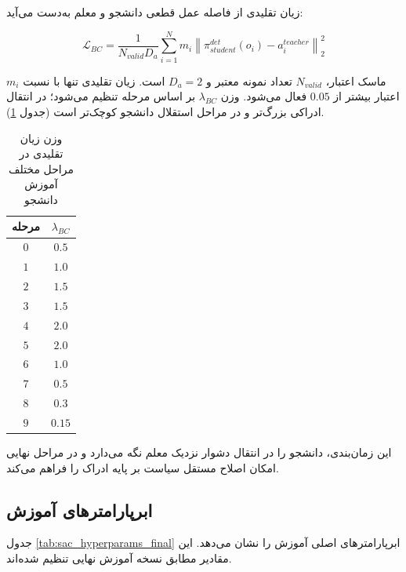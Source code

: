 زیان تقلیدی از فاصله عمل قطعی دانشجو و معلم به‌دست می‌آید:

\begin{equation}
	\mathcal{L}_{BC}=
	\frac{1}{N_{valid}D_a}
	\sum_{i=1}^{N}
	m_i
	\left\|
	\pi^{det}_{student}(o_i)-a^{teacher}_i
	\right\|_2^2
	\label{eq:bc_loss_final}
\end{equation}

\(m_i\) ماسک اعتبار، \(N_{valid}\) تعداد نمونه معتبر و \(D_a=2\) است. زیان تقلیدی تنها با نسبت اعتبار بیشتر از \(0.05\) فعال می‌شود. وزن \(\lambda_{BC}\) بر اساس مرحله تنظیم می‌شود؛ در انتقال ادراکی بزرگ‌تر و در مراحل استقلال دانشجو کوچک‌تر است (جدول \ref{tab:bc_weight_by_stage_final}).

\begin{table}[htbp]
	\centering
	\caption{وزن زیان تقلیدی در مراحل مختلف آموزش دانشجو}
	\label{tab:bc_weight_by_stage_final}
	\begin{tabular}{|c|c|}
		\hline
		\textbf{مرحله} & \(\lambda_{BC}\) \\
		\hline
		$0$ & $0.5$ \\
		\hline
		$1$ & $1.0$ \\
		\hline
		$2$ & $1.5$ \\
		\hline
		$3$ & $1.5$ \\
		\hline
		$4$ & $2.0$ \\
		\hline
		$5$ & $2.0$ \\
		\hline
		$6$ & $1.0$ \\
		\hline
		$7$ & $0.5$ \\
		\hline
		$8$ & $0.3$ \\
		\hline
		$9$ & $0.15$ \\
		\hline
	\end{tabular}
\end{table}

این زمان‌بندی، دانشجو را در انتقال دشوار نزدیک معلم نگه می‌دارد و در مراحل نهایی امکان اصلاح مستقل سیاست بر پایه ادراک را فراهم می‌کند.

\subsection{ابرپارامترهای آموزش}
\label{subsec:training_hyperparameters_final}

جدول \ref{tab:sac_hyperparams_final} ابرپارامترهای اصلی آموزش را نشان می‌دهد. این مقادیر مطابق نسخه آموزش نهایی تنظیم شده‌اند.

